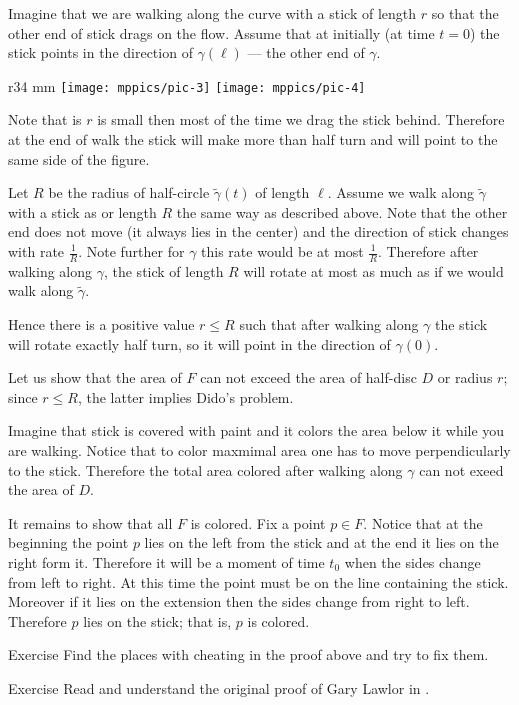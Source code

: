 Imagine that we are walking along the curve with a stick of length $r$ so that the other end of stick drags on the flow.
Assume that at initially (at time $t=0$) the stick points in the direction of $\gamma(\ell)$ --- the other end of $\gamma$.

\begin{wrapfigure}{r}{34 mm}
\vskip-0mm
\centering
\texttt{[image: mppics/pic-3]}
\bigskip
\texttt{[image: mppics/pic-4]}
\end{wrapfigure}

Note that is $r$ is small then most of the time we drag the stick behind. Therefore at the end of walk the stick will make more than half turn and will point to the same side of the figure.

Let $R$ be the radius of half-circle $\tilde\gamma(t)$ of length $\ell$.
Assume we walk along $\tilde\gamma$  with a stick as or length $R$ the same way as described above.
Note that the other end does not move (it always lies in the center) and the direction of stick changes with rate $\tfrac1R$.
Note further for $\gamma$ this rate would be at most $\tfrac1R$.
Therefore after walking along $\gamma$,
the stick of length $R$ will rotate at most as much as if we would walk along $\tilde\gamma$.

Hence there is a positive value $r\le R$ such that after walking along $\gamma$ the stick will rotate exactly half turn, so it will point in the direction of $\gamma(0)$.

Let us show that the area of $F$ can not exceed the area of half-disc $D$ or radius $r$;
since $r\le R$, the latter implies Dido's problem.

Imagine that stick is covered with paint and it colors the area below it while you are walking.
Notice that to color maxmimal area one has to move perpendicularly to the stick.
Therefore the total area colored after walking along $\gamma$ can not exeed the area of $D$.

It remains to show that all $F$ is colored.
Fix a point $p\in F$.
Notice that at the beginning the point $p$ lies on the left from the stick and at the end it lies on the right form it.
Therefore it will be a moment of time $t_0$ when the sides change from left to right.
At this time the point must be on the line containing the stick. Moreover if it lies on the extension then the sides change from right to left. Therefore $p$ lies on the stick; that is, $p$ is colored.
\qeds

\begin{thm}{Exercise}
Find the places with cheating in the proof above and try to fix them.
\end{thm}

\begin{thm}{Exercise} Read and understand the original proof of Gary Lawlor in \cite{lawlor}.
\end{thm}


